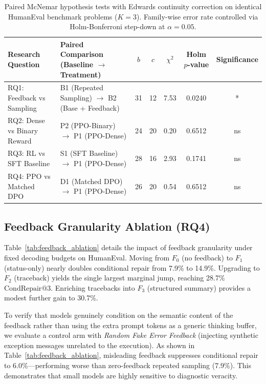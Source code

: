 \documentclass[letterpaper]{article} %
\begin{document}
\begin{table}[t]
\centering
\small
\setlength{\tabcolsep}{5.0pt}
\begin{tabular}{llccccc}
\toprule
\textbf{Research Question} & \textbf{Paired Comparison (Baseline $\rightarrow$ Treatment)} & \textbf{$b$} & \textbf{$c$} & \textbf{$\chi^2$} & \textbf{Holm $p$-value} & \textbf{Significance} \\
\midrule
RQ1: Feedback vs Sampling & B1 (Repeated Sampling) $\rightarrow$ B2 (Base + Feedback) & 31 & 12 & 7.53 & 0.0240 & * \\
RQ2: Dense vs Binary Reward & P2 (PPO-Binary) $\rightarrow$ P1 (PPO-Dense) & 24 & 20 & 0.20 & 0.6512 & ns \\
RQ3: RL vs SFT Baseline & S1 (SFT Baseline) $\rightarrow$ P1 (PPO-Dense) & 28 & 16 & 2.93 & 0.1741 & ns \\
RQ4: PPO vs Matched DPO & D1 (Matched DPO) $\rightarrow$ P1 (PPO-Dense) & 26 & 20 & 0.54 & 0.6512 & ns \\
\bottomrule
\end{tabular}
\caption{Paired McNemar hypothesis tests with Edwards continuity correction on identical HumanEval benchmark problems ($K=3$). Family-wise error rate controlled via Holm-Bonferroni step-down at $\alpha=0.05$.}
\label{tab:hypothesis_testing}
\end{table}

\subsection{Feedback Granularity Ablation (RQ4)}
Table~\ref{tab:feedback_ablation} details the impact of feedback granularity under fixed decoding budgets on HumanEval. Moving from $F_0$ (no feedback) to $F_1$ (status-only) nearly doubles conditional repair from 7.9\% to 14.9\%. Upgrading to $F_2$ (traceback) yields the single largest marginal jump, reaching 28.7\% $\text{CondRepair}@3$. Enriching tracebacks into $F_3$ (structured summary) provides a modest further gain to 30.7\%.

To verify that models genuinely condition on the semantic content of the feedback rather than using the extra prompt tokens as a generic thinking buffer, we evaluate a control arm with \textit{Random Fake Error Feedback} (injecting synthetic exception messages unrelated to the execution). As shown in Table~\ref{tab:feedback_ablation}, misleading feedback suppresses conditional repair to 6.0\%---performing worse than zero-feedback repeated sampling (7.9\%). This demonstrates that small models are highly sensitive to diagnostic veracity.
\end{document}
